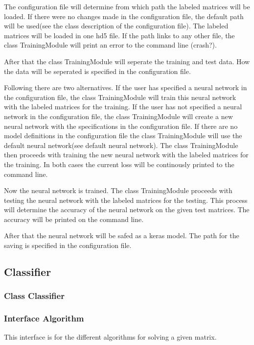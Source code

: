 \documentclass[parskip=full]{scrartcl}
\begin{document}
The configuration file will determine from which path the labeled matrices will be loaded. If there were no changes made in the configuration file, the default path will be used(see the class description of the configuration file). The labeled matrices will be loaded in one hd5 file. If the path links to any other file, the class TrainingModule will print an error to the command line (crash?). \newline

After that the class TrainingModule will seperate the training and test data. How the data will be seperated is specified in the configuration file.\newline

Following there are two alternatives. If the user has specified a neural network in the configuration file, the class TrainingModule will train this neural network with the labeled matrices for the training. If the user has not specified a neural network in the configuration file, the class TrainingModule will create a new neural network with the specifications in the configuration file. If there are no model definitions in the configuration file the class TrainingModule will use the default neural network(see default neural network). The class TrainingModule then proceeds with training the new neural network with the labeled matrices for the training. In both cases the current loss will be continously printed to the command line.\newline

Now the neural network is trained. The class TrainingModule proceeds with testing the neural network with the labeled matrices for the testing. This process will determine the accuracy of the neural network on the given test matrices. The accuracy will be printed on the command line.\newline

After that the neural network will be safed as a keras model. The path for the saving is specified in the configuration file.




\subsection{Classifier}
\subsubsection{Class Classifier}
\subsubsection{Interface Algorithm}
This interface is for the different algorithms for solving a given matrix.
\end{document}

